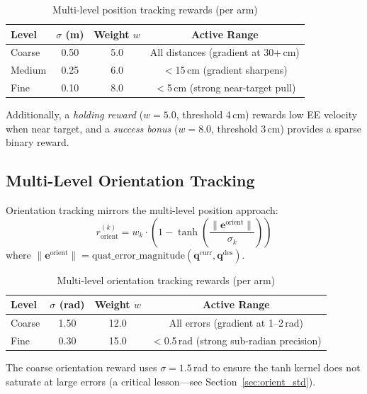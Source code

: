 \documentclass[11pt,a4paper]{article}
\begin{document}
\begin{table}[H]
\centering
\caption{Multi-level position tracking rewards (per arm)}
\label{tab:pos_rewards}
\begin{tabular}{@{}lccc@{}}
\toprule
\textbf{Level} & \textbf{$\sigma$ (m)} & \textbf{Weight $w$} & \textbf{Active Range} \\
\midrule
Coarse & 0.50 & 5.0 & All distances (gradient at 30+\,cm) \\
Medium & 0.25 & 6.0 & $<$15\,cm (gradient sharpens) \\
Fine   & 0.10 & 8.0 & $<$5\,cm (strong near-target pull) \\
\bottomrule
\end{tabular}
\end{table}

\noindent Additionally, a \emph{holding reward} ($w=5.0$, threshold 4\,cm) rewards low EE velocity when near target, and a \emph{success bonus} ($w=8.0$, threshold 3\,cm) provides a sparse binary reward.

\subsection{Multi-Level Orientation Tracking}
Orientation tracking mirrors the multi-level position approach:
\begin{equation}
  r_{\text{orient}}^{(k)} = w_k \cdot \left(1 - \tanh\left(\frac{\|\mathbf{e}^{\text{orient}}\|}{\sigma_k}\right)\right)
\end{equation}
where $\|\mathbf{e}^{\text{orient}}\| = \text{quat\_error\_magnitude}(\mathbf{q}^{\text{curr}}, \mathbf{q}^{\text{des}})$.

\begin{table}[H]
\centering
\caption{Multi-level orientation tracking rewards (per arm)}
\label{tab:orient_rewards}
\begin{tabular}{@{}lccc@{}}
\toprule
\textbf{Level} & \textbf{$\sigma$ (rad)} & \textbf{Weight $w$} & \textbf{Active Range} \\
\midrule
Coarse & 1.50 & 12.0 & All errors (gradient at 1--2\,rad) \\
Fine   & 0.30 & 15.0 & $<$0.5\,rad (strong sub-radian precision) \\
\bottomrule
\end{tabular}
\end{table}

\noindent The coarse orientation reward uses $\sigma=1.5$\,rad to ensure the tanh kernel does not saturate at large errors (a critical lesson---see Section~\ref{sec:orient_std}).
\end{document}
